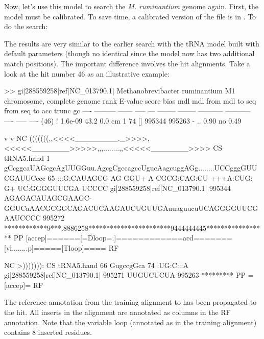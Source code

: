 Now, let's use this model to search the \emph{M. ruminantium} genome
again. First, the model must be calibrated. To save time, a calibrated
version of the file is in . To do the
search:


The results are very similar to the earlier search with the
tRNA model built with default  parameters (though no
identical since the model now has two additional match positions). The
important difference involves the hit alignments. Take a look at the
hit number 46 as an illustrative example:

\begin{sreoutput}
>> gi|288559258|ref|NC_013790.1|  Methanobrevibacter ruminantium M1 chromosome, complete genome
 rank     E-value  score  bias mdl mdl from   mdl to       seq from      seq to       acc trunc   gc
 ----   --------- ------ ----- --- -------- --------    ----------- -----------      ---- ----- ----
 (46) !   1.6e-09   43.2   0.0  cm        1       74 []      995344      995263 - .. 0.90    no 0.49

                                                   v          v                                                   NC
                                       (((((((,,<<<<________._>>>>,<<<<<_______>>>>>,,,........,,<<<<<_______>>>> CS
                     tRNA5.hand      1 gCcggcaUAGcgcAgUUGGuu.AgcgCgccagccUgucAagcuggAGg........UCCgggGUUCGAUUCccc 65    
                                       :::G:CAUAGCG AG  GGU+ A CGCG:CAG:CU +++A:CUG: G+        UC:GGGGUUCGA UCCCC
  gi|288559258|ref|NC_013790.1| 995344 AGAGACAUAGCGAAGC-GGUCaAACGCGGCAGACUCAAGAUCUGUUGAuuaguucuUCAGGGGUUCGAAUCCCC 995272
                                       ************9***.8886258***********************9444444445***************** PP
                                       [accep]======[=Dloop=.]============acd=======[vl........p]=====[Tloop]==== RF

                                                 NC
                                       >))))))): CS
                     tRNA5.hand     66 GugccgGca 74    
                                       :UG:C:::A
  gi|288559258|ref|NC_013790.1| 995271 UUGUCUCUA 995263
                                       ********* PP
                                       =[accep]= RF
\end{sreoutput}

The reference annotation from the training alignment to 
has been propagated to the hit. All inserts in the alignment are
annotated as  columns in the RF annotation. Note that the
variable loop (annotated as \ccode{[vlp]} in the training alignment)
contains 8 inserted residues. 
